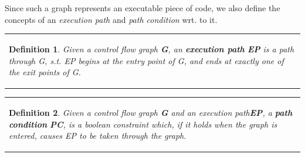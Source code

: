 \documentclass{article}
\newcommand{\tmem}[1]{{\em #1\/}}
\newcommand{\tmstrong}[1]{\textbf{#1}}
\newenvironment{tmparmod}[3]{\begin{list}{}{\setlength{\topsep}{0pt}\setlength{\leftmargin}{#1}\setlength{\rightmargin}{#2}\setlength{\parindent}{#3}\setlength{\listparindent}{\parindent}\setlength{\itemindent}{\parindent}\setlength{\parsep}{\parskip}} \item[]}{\end{list}}
\newtheorem{definition}{Definition}
{\theorembodyfont{\rmfamily}\newtheorem{example}{Example}}
\begin{document}
Since such a graph represents an executable piece of code, we also define the
concepts of an {\tmem{execution path}} and {\tmem{path condition}} wrt. to it.





\begin{tmparmod}{1cm}{0pt}{0pt}
  \begin{tmparmod}{0pt}{1cm}{0pt}
    {\noindent}{\noindent}\begin{tabular}{l}
      \begin{definition}
        
        
        
        
        Given a control flow graph {\tmem{{\tmstrong{G{\tmstrong{}}}}}}, an
        {\tmstrong{execution path}} {\tmstrong{{\tmem{EP{\tmstrong{}}}}}} is a
        path through G, s.t. EP begins at the entry point of G, and ends at
        exactly one of the exit points of G. 
      \end{definition}
    \end{tabular}{\hspace*{\fill}}{\smallskip}
  \end{tmparmod}
\end{tmparmod}





\begin{tmparmod}{1cm}{0pt}{0pt}
  \begin{tmparmod}{0pt}{1cm}{0pt}
    {\noindent}{\noindent}\begin{tabular}{l}
      \begin{definition}
        
        
        
        
        Given a control flow graph {\tmem{{\tmstrong{G{\tmstrong{}}}}}} and an
        execution path{\tmstrong{ {\tmem{EP{\tmstrong{}}}}}}, a
        {\tmstrong{path condition}} {\tmem{{\tmstrong{PC}}}}, is a boolean
        constraint which, if it holds when the graph is entered, causes EP to
        be taken through the graph.
      \end{definition}
    \end{tabular}{\hspace*{\fill}}{\smallskip}
  \end{tmparmod}
\end{tmparmod}
\end{document}
